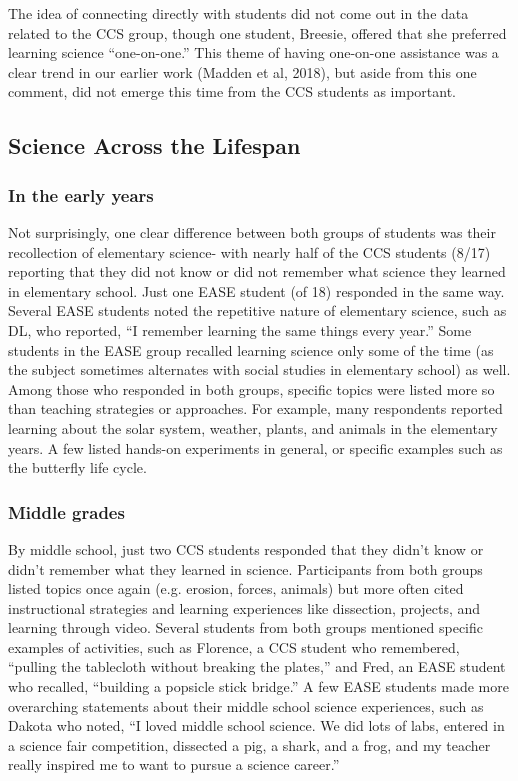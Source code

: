 \documentclass[11pt]{sig-alternate}
\begin{document}
\begin{large}
The idea of connecting directly with students did not come out in the data related to the CCS group, though one student, Breesie, offered that she preferred learning science “one-on-one.” This theme of having one-on-one assistance was a clear trend in our earlier work (Madden et al, 2018), but aside from this one comment, did not emerge this time from the CCS students as important. 

\subsection*{Science Across the Lifespan}
\subsubsection*{In the early years}

Not surprisingly, one clear difference between both groups of students was their recollection of elementary science- with nearly half of the CCS students (8/17) reporting that they did not know or did not remember what science they learned in elementary school. Just one EASE student (of 18) responded in the same way. Several EASE students noted the repetitive nature of elementary science, such as DL, who reported, “I remember learning the same things every year.” Some students in the EASE group recalled learning science only some of the time (as the subject sometimes alternates with social studies in elementary school) as well. Am\-ong those who responded in both groups, specific topics were listed more so than teaching strategies or approaches. For example, many respondents reported learning about the solar system, weather, plants, and animals in the elementary years. A few listed hands-on experiments in general, or specific examples such as the butterfly life cycle.


\subsubsection*{Middle grades}

By middle school, just two CCS students responded that they didn’t know or didn’t remember what they learned in science. Participants from both groups listed topics once again (e.g. erosion, forces, animals) but more often cited instructional strategies and learning experiences like dissection, projects, and learning through video. Several students from both groups mentioned specific examples of activities, such as Florence, a CCS student who remembered, “pulling the tablecloth without breaking the plates,” and Fred, an EASE student who recalled, “building a popsicle stick bridge.” A few EASE students made more overarching statements about their middle school science experiences, such as Dakota who noted, “I loved middle school science. We did lots of labs, entered in a science fair competition, dissected a pig, a shark, and a frog, and my teacher really inspired me to want to pursue a science career.”


\end{large}
\end{document}
